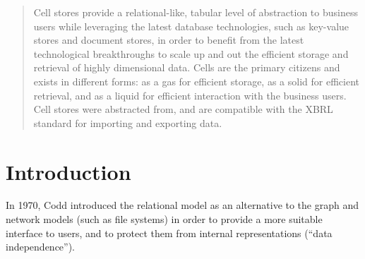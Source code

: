 \documentclass{vldb}
\begin{document}
\author{
%
%
\alignauthor
Ghislain Fourny\\
       \\
       \\
}
\date{8 September 2014}


\maketitle

\begin{abstract}
Cell stores provide a relational-like, tabular level of abstraction to business users while leveraging the latest database technologies, such as key-value stores and document stores, in order to benefit from the latest technological breakthroughs to scale up and out the efficient storage and retrieval of highly dimensional data. Cells are the primary citizens and exists in different forms: as a gas for efficient storage, as a solid for efficient retrieval, and as a liquid for efficient interaction with the business users. Cell stores were abstracted from, and are compatible with the XBRL standard for importing and exporting data.
\end{abstract}


\section{Introduction}
In 1970, Codd \cite{Codd1970} introduced the relational model as an alternative to the graph and network models (such as file systems) in order to provide a more suitable interface to users, and to protect them from internal representations (``data independence'').
\end{document}
